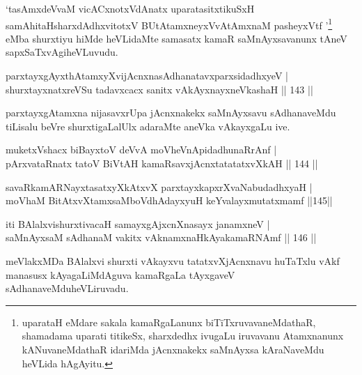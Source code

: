 \begin{artha}
`tasAmxdeVvaM vicACxnotxVdAnatx uparatasitxtikuSxH samAhitaH\break sharxdAdhxvitotxV BUtA\s\s tamxneyxVvA\s tAmxnaM pasheyxVtf '\footnote{uparataH eMdare sakala kamaRgaLanunx biTiTxruvavaneMdathaR, shamadama uparati titikeSx, sharxdedhx ivugaLu iruvavanu Atamxnanunx kANuvaneMdathaR idariMda jAcnxnakekx saMnAyxsa kAraNaveMdu heVLida hAgAyitu.} eMba shurxtiyu hiMde heVLidaMte samasatx kamaR saMnAyxsavanunx tAneV sapxSaTxvAgi\break heVLuvudu.
\end{artha}

\begin{shl}
parxtayxgAyxthAtamxyXvijAcnxnasAdhanatavxparxsidadhxyeV |\\
shurxtayxnatxreVSu tadavxcacx sanitx vAkAyxnayxneVkashaH \hfill || 143 ||
\end{shl}	

\begin{artha}
parxtayxgAtamxna nijasavxrUpa jAcnxnakekx saMnAyxsavu sAdhanaveMdu tiLisalu beVre shurxtigaLalUlx adaraMte aneVka vAkayxgaLu ive. 
\end{artha}


\begin{shl}
muketxVshacx biBayxtoV deVvA moVheVnApidadhunaRrAnf |\\
pArxvataRnatx tatoV BiVtAH kamaRsavxjAcnxtatatatxvXkAH \hfill || 144 ||
\end{shl}

\begin{shl}
savaRkamARNayxtasatxyXkAtxvX parxtayxkapxrXvaNabudadhxyaH |\\
moVhaM BitAtxvX\s \s tamxsaMboVdhAdayxyuH keYvalayxmutatxmamf \hfill ||145||
\end{shl}

\begin{shl}
iti BAlalxvishurxtivacaH samayxgAjxcnXnasayx janamxneV |\\
saMnAyxsaM sAdhanaM vakitx vAknamxnaHkAyakamaRNAmf \hfill || 146 ||
\end{shl}

\begin{artha}%
meVlakxMDa BAlalxvi shurxti vAkayxvu tatatxvXjAcnxnavu huTaTxlu vAkf manasusx kAyagaLiMdAguva kamaRgaLa tAyxgaveV sAdhanaveMdu\break heVLiruvadu.
\end{artha}


